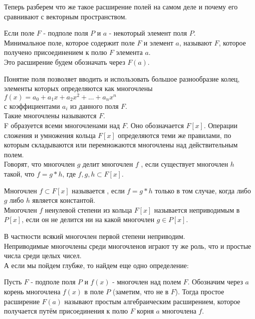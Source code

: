 Теперь разберем что же такое расширение полей на самом деле и почему
его сравнивают с векторным пространством.\\
\begin{defin}
Если поле $F$ - подполе поля $P$ и $a$ - некоторый элемент поля $P$.\\
Минимальное поле, которое содержит поле $F$ и элемент $a$,
называют  $F$, которое получено
присоединением к полю $F$ элемента $a$.\\
Это расширение будем обозначать через $F(a)$.
\end{defin}

Понятие поля позволяет вводить и использовать большое 
разнообразие колец, элементы которых определяются как многочлены\\
$f(x) = a_{0} + a_{1}x + a_{2}x^{2} + ... + a_{n}x^{n}$\\
с коэффициентами $a_{i}$ из данного поля $F$.\\ 
Такие многочлены называются  $F$.\\
 F образуется всеми многочленами над $F$.
Оно обозначается $F[x]$. Операции сложения и умножения кольца $F[x]$
определяются теми же правилами, по которым складываются или 
перемножаются многочлены над действительным полем.\\
Говорят, что многочлен $g$ делит многочлен $f$ , если существует 
многочлен $h$ такой, что $f = g\ast{h}$, где $f, g, h \subset{F[x]}$.\\

\begin{defin}
Многочлен $f\subset{F[x]}$ называется , 
если $f = g\ast{h}$ только в том случае, когда либо $g$ либо $h$
является константой.\\
Многочлен $f$ ненулевой степени из кольца $F[x]$ называется
неприводимым в $P[x]$, если он не делится ни на какой многочлен $g\in{P[x]}$.
\end{defin}

В частности всякий многочлен первой степени неприводим.\\
Неприводимые многочлены среди многочленов играют ту же роль,
что и простые числа среди целых чисел.\\ 

А если мы пойдем глубже, то найдем еще одно определение:\\

\begin{defin}
Пусть $F$ - подполе поля $P$ и $f(x)$ - многочлен над полем $F$.
Обозначим через $a$ корень многочлена $f(x)$ в поле $P$
(заметим, что не в $F$). Тогда простое расширение $F(a)$
называют простым алгебраическим расширением, которое
получается путём присоединения к полю $F$ корня $a$
многочлена $f$. 
\end{defin}

